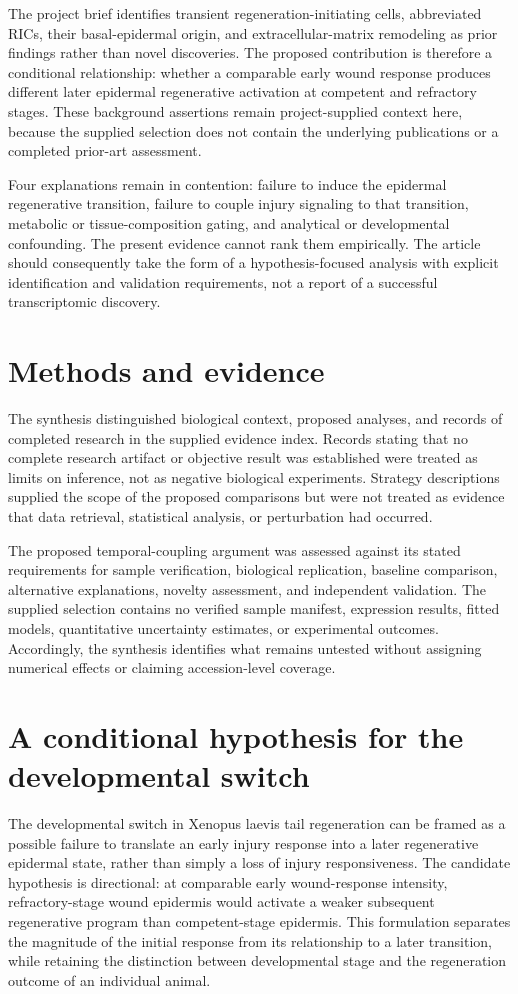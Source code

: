 \documentclass[11pt]{article}
\begin{document}
The project brief identifies transient regeneration-initiating cells, abbreviated RICs, their basal-epidermal origin, and extracellular-matrix remodeling as prior findings rather than novel discoveries. The proposed contribution is therefore a conditional relationship: whether a comparable early wound response produces different later epidermal regenerative activation at competent and refractory stages. These background assertions remain project-supplied context here, because the supplied selection does not contain the underlying publications or a completed prior-art assessment.

Four explanations remain in contention: failure to induce the epidermal regenerative transition, failure to couple injury signaling to that transition, metabolic or tissue-composition gating, and analytical or developmental confounding. The present evidence cannot rank them empirically. The article should consequently take the form of a hypothesis-focused analysis with explicit identification and validation requirements, not a report of a successful transcriptomic discovery.

\section{Methods and evidence}
The synthesis distinguished biological context, proposed analyses, and records of completed research in the supplied evidence index. Records stating that no complete research artifact or objective result was established were treated as limits on inference, not as negative biological experiments. Strategy descriptions supplied the scope of the proposed comparisons but were not treated as evidence that data retrieval, statistical analysis, or perturbation had occurred.

The proposed temporal-coupling argument was assessed against its stated requirements for sample verification, biological replication, baseline comparison, alternative explanations, novelty assessment, and independent validation. The supplied selection contains no verified sample manifest, expression results, fitted models, quantitative uncertainty estimates, or experimental outcomes. Accordingly, the synthesis identifies what remains untested without assigning numerical effects or claiming accession-level coverage.

\section{A conditional hypothesis for the developmental switch}
The developmental switch in Xenopus laevis tail regeneration can be framed as a possible failure to translate an early injury response into a later regenerative epidermal state, rather than simply a loss of injury responsiveness. The candidate hypothesis is directional: at comparable early wound-response intensity, refractory-stage wound epidermis would activate a weaker subsequent regenerative program than competent-stage epidermis. This formulation separates the magnitude of the initial response from its relationship to a later transition, while retaining the distinction between developmental stage and the regeneration outcome of an individual animal.
\end{document}
